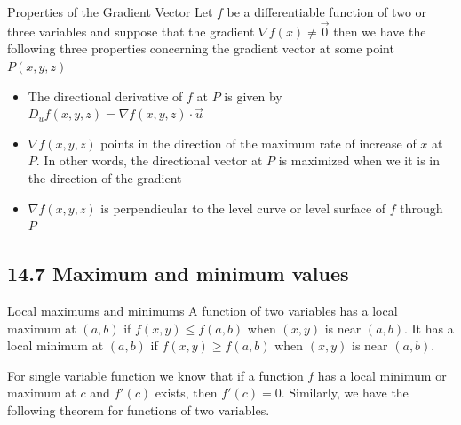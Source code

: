 \documentclass{article}
\begin{document}
	\begin{mybox}
		{Properties of the Gradient Vector} Let $f$ be a differentiable function of two
		or three variables and suppose that the gradient $\nabla f(x) \not = \vec{0}$
		then we have the following three properties concerning the gradient vector at
		some point $P(x,y,z)$
		\begin{itemize}
			\item The directional derivative of $f$ at $P$ is given by $D_{u}f(x,y,z)=
				\nabla f(x,y,z) \cdot \vec{u}$

			\item $\nabla f(x,y,z)$ points in the direction of the maximum rate of increase
				of $x$ at $P$. In other words, the directional vector at $P$ is maximized
				when we it is in the direction of the gradient

			\item $\nabla f(x,y,z)$ is perpendicular to the level curve or level surface
				of $f$ through $P$
		\end{itemize}
	\end{mybox}
	\subsection{14.7 Maximum and minimum values}
	\begin{mybox}
		{Local maximums and minimums} A function of two variables has a local maximum
		at $(a,b)$ if $f(x,y) \leq f(a,b)$ when $(x,y)$ is near $(a,b)$. It has a
		local minimum at $(a,b)$ if $f(x,y) \geq f(a,b)$ when $(x,y)$ is near
		$(a,b)$.
	\end{mybox}

	For single variable function we know that if a function $f$ has a local minimum
	or maximum at $c$ and $f'(c)$ exists, then $f'(c) = 0$. Similarly, we have the
	following theorem for functions of two variables.
\end{document}
